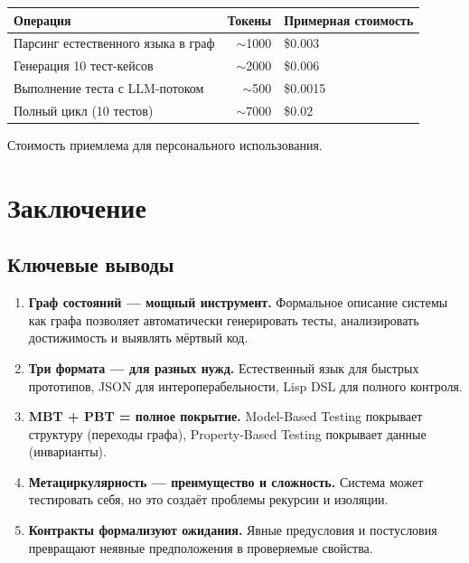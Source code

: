 \documentclass[12pt, a4paper, twoside]{article}
\begin{document}
\begin{center}
\begin{tabular}{lrl}
  \toprule
  \textbf{Операция} & \textbf{Токены} & \textbf{Примерная стоимость} \\
  \midrule
  Парсинг естественного языка в граф & $\sim$1000 & \$0.003 \\
  Генерация 10 тест-кейсов & $\sim$2000 & \$0.006 \\
  Выполнение теста с LLM-потоком & $\sim$500 & \$0.0015 \\
  Полный цикл (10 тестов) & $\sim$7000 & \$0.02 \\
  \bottomrule
\end{tabular}
\end{center}

Стоимость приемлема для персонального использования.

\section{Заключение}

\subsection{Ключевые выводы}

\begin{enumerate}[leftmargin=1.5em]
  \item \textbf{Граф состояний --- мощный инструмент.} Формальное описание
    системы как графа позволяет автоматически генерировать тесты, анализировать
    достижимость и выявлять мёртвый код.

  \item \textbf{Три формата --- для разных нужд.} Естественный язык для
    быстрых прототипов, JSON для интероперабельности, Lisp DSL для полного
    контроля.

  \item \textbf{MBT + PBT = полное покрытие.} Model-Based Testing покрывает
    структуру (переходы графа), Property-Based Testing покрывает данные
    (инварианты).

  \item \textbf{Метациркулярность --- преимущество и сложность.} Система
    может тестировать себя, но это создаёт проблемы рекурсии и изоляции.

  \item \textbf{Контракты формализуют ожидания.} Явные предусловия и
    постусловия превращают неявные предположения в проверяемые свойства.
\end{enumerate}
\end{document}
